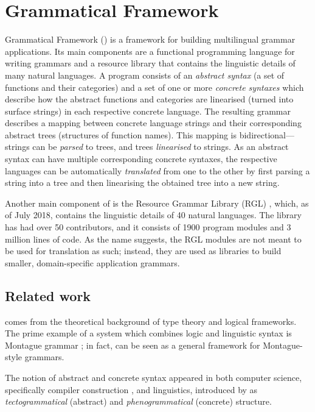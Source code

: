 \section{Grammatical Framework}
\label{sec:gf-intro}

Grammatical Framework (\gf{}) \cite{ranta2011gfbook} is a framework for
building multilingual grammar applications. Its main components are a
functional programming language for writing grammars and a resource
library that contains the linguistic details of many natural
languages.  A \gf{} program consists of an \emph{abstract syntax} (a set
of functions and their categories) and a set of one or more
\emph{concrete syntaxes} which describe how the abstract functions and
categories are linearised (turned into surface strings) in each
respective concrete language. The resulting grammar describes a
mapping between concrete language strings and their corresponding
abstract trees (structures of function names).  This mapping is
bidirectional---strings can be \emph{parsed} to trees, and trees
\emph{linearised} to strings.  As an abstract syntax can have multiple
corresponding concrete syntaxes, the respective languages can be
automatically \emph{translated} from one to the other by first parsing
a string into a tree and then linearising the obtained tree into a new
string.

Another main component of \gf{} is the Resource Grammar Library (RGL)
\cite{ranta2009rgl}, which, as of July 2018, contains the linguistic
details of 40 natural languages. The library has had over 50
contributors, and it consists of 1900 program modules and 3 million
lines of code. As the name suggests, the RGL modules are not meant to
be used for translation as such; instead, they are used as libraries
to build smaller, domain-specific application grammars.

\subsection{Related work}

\gf{} comes from the theoretical background of type theory and logical
frameworks. The prime example of a system which combines logic and
linguistic syntax is Montague grammar \cite{montague}; in fact, \gf{}
can be seen as a general framework for Montague-style grammars.

The notion of abstract and concrete syntax appeared in both computer
science, specifically compiler construction \cite{mccarthy62}, and
linguistics, introduced by \citet{curry1961} as
\emph{tectogrammatical} (abstract) and \emph{phenogrammatical}
(concrete) structure.

